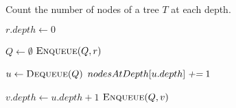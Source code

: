 
\begin{algorithm}[H]
  \caption{Count the number of nodes of a tree $T$ at each depth.}
  \label{alg:nodes-at-depth}
  \begin{algorithmic}[1]
     
      \State $r.depth \gets 0$

      \hStatex
      \State $Q \gets \emptyset$
      \State $\Call{Enqueue}{Q, r}$

      \hStatex
	\State $u \gets \Call{Dequeue}{Q}$
	\State $nodesAtDepth[u.depth] \textsl{\;+=\;} 1$

	\hStatex
	  \State $v.depth \gets u.depth + 1$
	  \State $\Call{Enqueue}{Q, v}$
	\EndFor
      \EndWhile
    \EndProcedure
  \end{algorithmic}
\end{algorithm}
